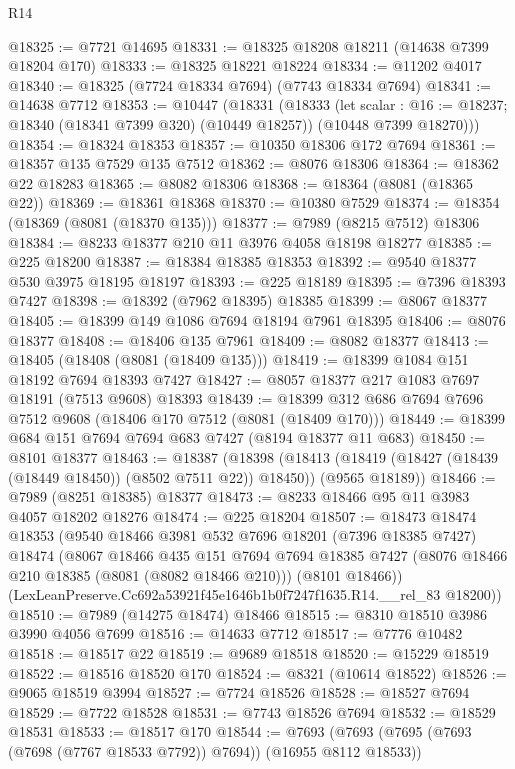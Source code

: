 \begin{lexlean}{R14}
\begin{coremodule}
@18325 := @7721 @14695
@18331 := @18325 @18208 @18211 (@14638 @7399 @18204 @170)
@18333 := @18325 @18221 @18224
@18334 := @11202 @4017
@18340 := @18325 (@7724 @18334 @7694) (@7743 @18334 @7694)
@18341 := @14638 @7712
@18353 := @10447
    (@18331
      (@18333
        (let scalar : @16 := @18237; @18340 (@18341 @7399 @320) (@10449 @18257))
        (@10448 @7399 @18270)))
@18354 := @18324 @18353
@18357 := @10350 @18306 @172 @7694
@18361 := @18357 @135 @7529 @135 @7512
@18362 := @8076 @18306
@18364 := @18362 @22 @18283
@18365 := @8082 @18306
@18368 := @18364 (@8081 (@18365 @22))
@18369 := @18361 @18368
@18370 := @10380 @7529
@18374 := @18354 (@18369 (@8081 (@18370 @135)))
@18377 := @7989 (@8215 @7512) @18306
@18384 := @8233 @18377 @210 @11 @3976 @4058 @18198 @18277
@18385 := @225 @18200
@18387 := @18384 @18385 @18353
@18392 := @9540 @18377 @530 @3975 @18195 @18197
@18393 := @225 @18189
@18395 := @7396 @18393 @7427
@18398 := @18392 (@7962 @18395) @18385
@18399 := @8067 @18377
@18405 := @18399 @149 @1086 @7694 @18194 @7961 @18395
@18406 := @8076 @18377
@18408 := @18406 @135 @7961
@18409 := @8082 @18377
@18413 := @18405 (@18408 (@8081 (@18409 @135)))
@18419 := @18399 @1084 @151 @18192 @7694 @18393 @7427
@18427 := @8057 @18377 @217 @1083 @7697 @18191 (@7513 @9608) @18393
@18439 := @18399 @312 @686 @7694 @7696 @7512 @9608 (@18406 @170 @7512 (@8081 (@18409 @170)))
@18449 := @18399 @684 @151 @7694 @7694 @683 @7427 (@8194 @18377 @11 @683)
@18450 := @8101 @18377
@18463 := @18387
    (@18398
      (@18413 (@18419 (@18427 (@18439 (@18449 @18450)) (@8502 @7511 @22)) @18450))
      (@9565 @18189))
@18466 := @7989 (@8251 @18385) @18377
@18473 := @8233 @18466 @95 @11 @3983 @4057 @18202 @18276
@18474 := @225 @18204
@18507 := @18473
    @18474
    @18353
    (@9540
      @18466
      @3981
      @532
      @7696
      @18201
      (@7396 @18385 @7427)
      @18474
      (@8067
        @18466
        @435
        @151
        @7694
        @7694
        @18385
        @7427
        (@8076 @18466 @210 @18385 (@8081 (@8082 @18466 @210)))
        (@8101 @18466))
      (LexLeanPreserve.Cc692a53921f45e1646b1b0f7247f1635.R14.__rel_83 @18200))
@18510 := @7989 (@14275 @18474) @18466
@18515 := @8310 @18510 @3986 @3990 @4056 @7699
@18516 := @14633 @7712
@18517 := @7776 @10482
@18518 := @18517 @22
@18519 := @9689 @18518
@18520 := @15229 @18519
@18522 := @18516 @18520 @170
@18524 := @8321 (@10614 @18522)
@18526 := @9065 @18519 @3994
@18527 := @7724 @18526
@18528 := @18527 @7694
@18529 := @7722 @18528
@18531 := @7743 @18526 @7694
@18532 := @18529 @18531
@18533 := @18517 @170
@18544 := @7693 (@7693 (@7695 (@7693 (@7698 (@7767 @18533 @7792)) @7694)) (@16955 @8112 @18533))

\end{coremodule}
\end{lexlean}
